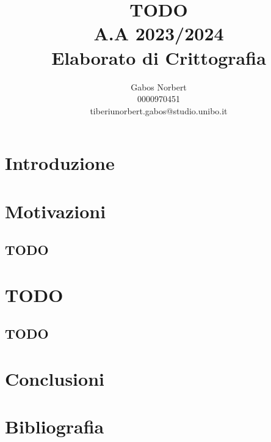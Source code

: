 \documentclass[a4paper,12pt, oneside]{article}
\title{\textbf{TODO} \\ \large A.A 2023/2024 \\ Elaborato di Crittografia}
\author{Gabos Norbert \\ 0000970451 \\ tiberiunorbert.gabos@studio.unibo.it }
\date{}
\begin{document}
\maketitle

\newpage
\tableofcontents{}
\newpage

\section{Introduzione}


\section{Motivazioni}
\subsection{TODO}

\section{TODO}
\subsection{TODO}

\section{Conclusioni}

\section{Bibliografia}
\end{document}
